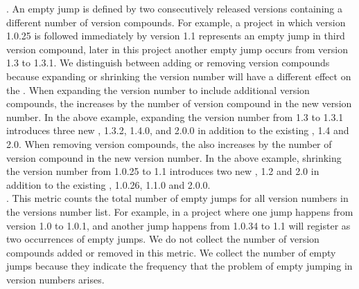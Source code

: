 \documentclass[conference]{IEEEtran}
\begin{document}
. An empty jump is defined by two consecutively released versions containing a different number of version compounds. 
For example, a project in which version 1.0.25 is followed immediately by version 1.1 represents an empty jump in third version compound, later in this project another empty jump occurs from version 1.3 to 1.3.1. 
We distinguish between adding or removing version compounds because expanding or shrinking the version number will have a different effect on the \numberchoices. 
When expanding the version number to include additional version compounds, the \numberchoices increases by the number of version compound in the new version number. In the above example, expanding the version number from 1.3 to 1.3.1 introduces three new \choices, 1.3.2, 1.4.0, and 2.0.0 in addition to the existing \choices, 1.4 and 2.0. 
When removing version compounds, the \numberchoices also increases by the number of version compound in the new version number. In the above example, shrinking the version number from 1.0.25 to 1.1 introduces two new \choices, 1.2 and 2.0 in addition to the existing \choices, 1.0.26, 1.1.0 and 2.0.0. \\


.  
This metric counts the total number of empty jumps for all version numbers in the versions number list. For example, in a project where one jump happens from version 1.0 to 1.0.1, and another jump happens from 1.0.34 to 1.1 will register as two occurrences of empty jumps.
We do not collect the number of version compounds added or removed in this metric.
We collect the number of empty jumps because they indicate the frequency that the problem of empty jumping in version numbers arises. \\

\end{document}
